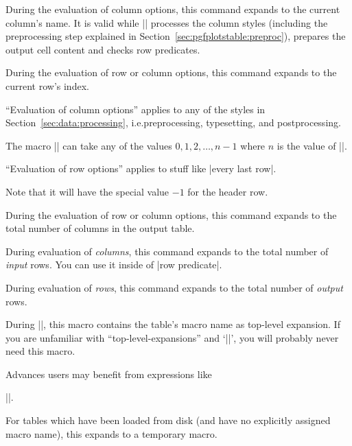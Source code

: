 \documentclass[a4paper]{ltxdoc}
\begin{document}
\begin{command}{\pgfplotstablecolname}
    During the evaluation of column options, this command expands to the
    current column's name. It is valid while |\pgfplotstabletypeset| processes
    the column styles (including the preprocessing step explained in
    Section~\ref{sec:pgfplotstable:preproc}), prepares the output cell content
    and checks row predicates.
\end{command}

\begin{command}{\pgfplotstablerow}
\label{pgfplotstable:page:tablerow}
    During the evaluation of row or column options, this command expands to the
    current row's index.

    ``Evaluation of column options'' applies to any of the styles in
    Section~\ref{sec:data:processing}, i.e.\@ preprocessing, typesetting, and
    postprocessing.

    The macro |\pgfplotstablerow| can take any of the values $0,1,2,\dotsc,n-1$
    where $n$ is the value of |\pgfplotstablerows|.

    ``Evaluation of row options'' applies to stuff like |every last row|.

    Note that it will have the special value $-1$ for the header row.
\end{command}

\begin{command}{\pgfplotstablecols}
    During the evaluation of row or column options, this command expands to the
    total number of columns in the output table.
\end{command}

\begin{command}{\pgfplotstablerows}
    During evaluation of \emph{columns}, this command expands to the total
    number of \emph{input} rows. You can use it inside of |row predicate|.

    During evaluation of \emph{rows}, this command expands to the total number
    of \emph{output} rows.
\end{command}

\begin{command}{\pgfplotstablename}
    During |\pgfplotstabletypeset|, this macro contains the table's macro name
    as top-level expansion. If you are unfamiliar with ``top-level-expansions''
    and `|\expandafter|', you will probably never need this macro.

    Advances users may benefit from expressions like

    |\expandafter\pgfplotstabletypeset\pgfplotstablename|.

    For tables which have been loaded from disk (and have no explicitly
    assigned macro name), this expands to a temporary macro.
\end{command}
\end{document}
